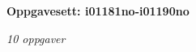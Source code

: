 \centerline{\bf Oppgavesett: i01181no-i01190no}
\vskip 10pt
\centerline{\it 10 oppgaver}\vskip 10pt
\vskip 10pt
